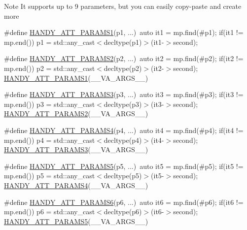\begin{DoxyNote}{Note}
It supports up to 9 parameters, but you can easily copy-\/paste and create more 
\end{DoxyNote}
\begin{DoxyCompactItemize}
\item 
\#define \hyperlink{group__HandyParamsGroup_gad6bc4ced0a70e08b768e5bb045e0f762}{H\+A\+N\+D\+Y\+\_\+\+A\+T\+T\+\_\+\+P\+A\+R\+A\+M\+S1}(p1, ...)~auto it1 = mp.\+find(\#p1);  if(it1 != mp.\+end()) p1 = std\+::any\+\_\+cast$<$decltype(p1)$>$(it1-\/$>$second);
\item 
\#define \hyperlink{group__HandyParamsGroup_ga704974fd416ad34e1c20e5871d922194}{H\+A\+N\+D\+Y\+\_\+\+A\+T\+T\+\_\+\+P\+A\+R\+A\+M\+S2}(p2, ...)~auto it2 = mp.\+find(\#p2);  if(it2 != mp.\+end()) p2 = std\+::any\+\_\+cast$<$decltype(p2)$>$(it2-\/$>$second); \hyperlink{group__HandyParamsGroup_gad6bc4ced0a70e08b768e5bb045e0f762}{H\+A\+N\+D\+Y\+\_\+\+A\+T\+T\+\_\+\+P\+A\+R\+A\+M\+S1}(\+\_\+\+\_\+\+V\+A\+\_\+\+A\+R\+G\+S\+\_\+\+\_\+)
\item 
\#define \hyperlink{group__HandyParamsGroup_ga5242771850490ae87776d358c99044fa}{H\+A\+N\+D\+Y\+\_\+\+A\+T\+T\+\_\+\+P\+A\+R\+A\+M\+S3}(p3, ...)~auto it3 = mp.\+find(\#p3);  if(it3 != mp.\+end()) p3 = std\+::any\+\_\+cast$<$decltype(p3)$>$(it3-\/$>$second); \hyperlink{group__HandyParamsGroup_ga704974fd416ad34e1c20e5871d922194}{H\+A\+N\+D\+Y\+\_\+\+A\+T\+T\+\_\+\+P\+A\+R\+A\+M\+S2}(\+\_\+\+\_\+\+V\+A\+\_\+\+A\+R\+G\+S\+\_\+\+\_\+)
\item 
\#define \hyperlink{group__HandyParamsGroup_ga6edfe7ad7b0f42713bf741b092697115}{H\+A\+N\+D\+Y\+\_\+\+A\+T\+T\+\_\+\+P\+A\+R\+A\+M\+S4}(p4, ...)~auto it4 = mp.\+find(\#p4);  if(it4 != mp.\+end()) p4 = std\+::any\+\_\+cast$<$decltype(p4)$>$(it4-\/$>$second); \hyperlink{group__HandyParamsGroup_ga5242771850490ae87776d358c99044fa}{H\+A\+N\+D\+Y\+\_\+\+A\+T\+T\+\_\+\+P\+A\+R\+A\+M\+S3}(\+\_\+\+\_\+\+V\+A\+\_\+\+A\+R\+G\+S\+\_\+\+\_\+)
\item 
\#define \hyperlink{group__HandyParamsGroup_gaad355ab5b4bd32d8526c521d4c5f5a07}{H\+A\+N\+D\+Y\+\_\+\+A\+T\+T\+\_\+\+P\+A\+R\+A\+M\+S5}(p5, ...)~auto it5 = mp.\+find(\#p5);  if(it5 != mp.\+end()) p5 = std\+::any\+\_\+cast$<$decltype(p5)$>$(it5-\/$>$second); \hyperlink{group__HandyParamsGroup_ga6edfe7ad7b0f42713bf741b092697115}{H\+A\+N\+D\+Y\+\_\+\+A\+T\+T\+\_\+\+P\+A\+R\+A\+M\+S4}(\+\_\+\+\_\+\+V\+A\+\_\+\+A\+R\+G\+S\+\_\+\+\_\+)
\item 
\#define \hyperlink{group__HandyParamsGroup_ga4f3e03cc235ac93a9a9077d1f421a129}{H\+A\+N\+D\+Y\+\_\+\+A\+T\+T\+\_\+\+P\+A\+R\+A\+M\+S6}(p6, ...)~auto it6 = mp.\+find(\#p6);  if(it6 != mp.\+end()) p6 = std\+::any\+\_\+cast$<$decltype(p6)$>$(it6-\/$>$second); \hyperlink{group__HandyParamsGroup_gaad355ab5b4bd32d8526c521d4c5f5a07}{H\+A\+N\+D\+Y\+\_\+\+A\+T\+T\+\_\+\+P\+A\+R\+A\+M\+S5}(\+\_\+\+\_\+\+V\+A\+\_\+\+A\+R\+G\+S\+\_\+\+\_\+)

\end{DoxyCompactItemize}
